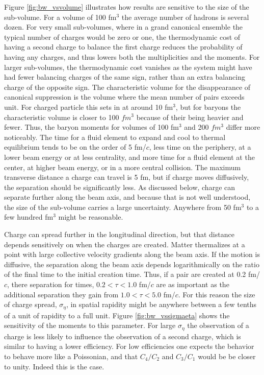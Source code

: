 Figure \ref{fig:bw_vsvolume} illustrates how results are sensitive to the size of the sub-volume. For a volume of 100 fm$^3$ the average number of hadrons is several dozen. For very small sub-volumes, where in a grand canonical ensemble the typical number of charges would be zero or one, the thermodynamic cost of having a second charge to balance the first charge reduces the probability of having any charges, and thus lowers both the multiplicities and the moments. For larger sub-volumes, the thermodynamic cost vanishes as the system might have had fewer balancing charges of the same sign, rather than an extra balancing charge of the opposite sign. The characteristic volume for the disappearance of canonical suppression is the volume where the mean number of pairs exceeds unit. For charged particle this sets in at around 10 fm$^3$, but for baryons the characteristic volume is closer to 100 $fm^3$ because of their being heavier and fewer. Thus, the baryon moments for volumes of 100 fm$^3$ and 200 $fm^3$ differ more noticeably. The time for a fluid element to expand and cool to thermal equilibrium tends to be on the order of 5 fm/$c$, less time on the periphery, at a lower beam energy or at less centrality, and more time for a fluid element at the center, at higher beam energy, or in a more central collision. The maximum transverse distance a charge can travel is 5 fm, but if charge moves diffusively, the separation should be significantly less. As discussed below, charge can separate further along the beam axis, and because that is not well understood, the size of the sub-volume carries a large uncertainty. Anywhere from 50 fm$^3$ to a few hundred fm$^3$ might be reasonable. 

Charge can spread further in the longitudinal direction, but that distance depends sensitively on when the charges are created. Matter thermalizes at a point with large collective velocity gradients along the beam axis. If the motion is diffusive, the separation along the beam axis depends logarithmically on the ratio of the final time to the initial creation time.  Thus, if a pair are created at 0.2 fm/$c$, there separation for times, $0.2<\tau<1.0$ fm/$c$ are as important as the additional separation they gain from $1.0<\tau<5.0$ fm/$c$. For this reason the size of charge spread, $\sigma_\eta$, in spatial rapidity might be anywhere between a few tenths of a unit of rapidity to a full unit. Figure \ref{fig:bw_vssigmaeta} shows the sensitivity of the moments to this parameter. For large $\sigma_\eta$ the observation of a charge is less likely to influence the observation of a second charge, which is similar to having a lower efficiency. For low efficiencies one expects the behavior to behave more like a Poissonian, and that $C_4/C_2$ and $C_3/C_1$ would be be closer to unity. Indeed this is the case.

